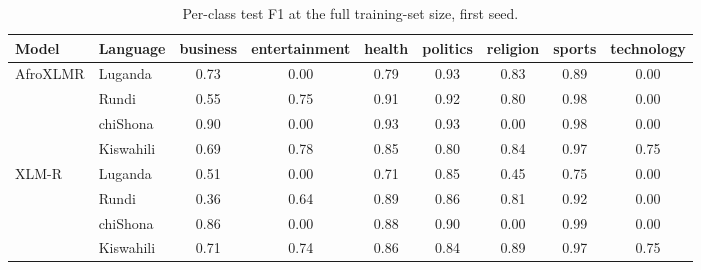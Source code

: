 \begin{table}[t]
\centering
\caption{Per-class test F1 at the full training-set size, first seed.}
\label{tab:per_class_f1}
\small
\begin{tabular}{llccccccc}
\toprule
Model & Language & business & entertainment & health & politics & religion & sports & technology \\
\midrule
AfroXLMR & Luganda & 0.73 & 0.00 & 0.79 & 0.93 & 0.83 & 0.89 & 0.00 \\
 & Rundi & 0.55 & 0.75 & 0.91 & 0.92 & 0.80 & 0.98 & 0.00 \\
 & chiShona & 0.90 & 0.00 & 0.93 & 0.93 & 0.00 & 0.98 & 0.00 \\
 & Kiswahili & 0.69 & 0.78 & 0.85 & 0.80 & 0.84 & 0.97 & 0.75 \\
\midrule
XLM-R & Luganda & 0.51 & 0.00 & 0.71 & 0.85 & 0.45 & 0.75 & 0.00 \\
 & Rundi & 0.36 & 0.64 & 0.89 & 0.86 & 0.81 & 0.92 & 0.00 \\
 & chiShona & 0.86 & 0.00 & 0.88 & 0.90 & 0.00 & 0.99 & 0.00 \\
 & Kiswahili & 0.71 & 0.74 & 0.86 & 0.84 & 0.89 & 0.97 & 0.75 \\
\bottomrule
\end{tabular}
\end{table}
